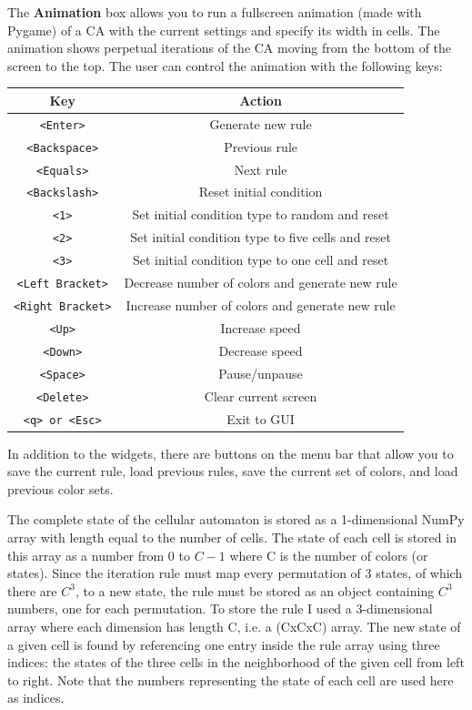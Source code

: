 \documentclass[12pt]{article}
\begin{document}
The \textbf{Animation} box allows you to run a fullscreen animation (made with Pygame) of a CA with the current settings and specify its width in cells.
The animation shows perpetual iterations of the CA moving from the bottom of the screen to the top.
The user can control the animation with the following keys:
\begin{center}
\begin{tabular}{|c|c|}
\hline
Key & Action \\ \hline
\texttt{<Enter>} & Generate new rule \\
\texttt{<Backspace>} & Previous rule \\
\texttt{<Equals>} & Next rule \\
\texttt{<Backslash>} & Reset initial condition \\
\texttt{<1>} & Set initial condition type to random and reset \\
\texttt{<2>} & Set initial condition type to five cells and reset \\
\texttt{<3>} & Set initial condition type to one cell and reset \\
\texttt{<Left Bracket>} & Decrease number of colors and generate new rule\\
\texttt{<Right Bracket>} & Increase number of colors and generate new rule\\
\texttt{<Up>} & Increase speed \\
\texttt{<Down>} & Decrease speed \\
\texttt{<Space>} & Pause/unpause \\
\texttt{<Delete>} & Clear current screen \\
\texttt{<q> or <Esc>} & Exit to GUI \\
\hline
\end{tabular}
\end{center}
\vspace{10bp}

In addition to the widgets, there are buttons on the menu bar that allow you to save the current rule, load previous rules, save the current set of colors, and load previous color sets.

The complete state of the cellular automaton is stored as a 1-dimensional NumPy array with length equal to the number of cells.
The state of each cell is stored in this array as a number from 0 to $C-1$ where C is the number of colors (or states).
Since the iteration rule must map every permutation of 3 states, of which there are $C^3$, to a new state, the rule must be stored as an object containing $C^3$ numbers, one for each permutation.
To store the rule I used a 3-dimensional array where each dimension has length C, i.e. a (CxCxC) array.
The new state of a given cell is found by referencing one entry inside the rule array using three indices:  the states of the three cells in the neighborhood of the given cell from left to right.
Note that the numbers representing the state of each cell are used here as indices.
\end{document}

